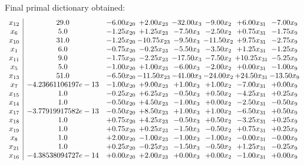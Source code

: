 \documentclass[8pt]{article}
\begin{document}
 Final primal dictionary obtained: 
\[\begin{array}{c| c c@{\hskip 2pt} c@{\hskip 2pt} c@{\hskip 2pt} c@{\hskip 2pt} c@{\hskip 2pt} c@{\hskip 2pt} }
 x_{12}   &  29.0 & -6.00 x_{20} & +  2.00 x_{23} & -32.00 x_{3} & -9.00 x_{2} & +  6.00 x_{31} & -7.00 x_{9}\\
 x_{6}   &  5.0 & -1.25 x_{20} & +  1.25 x_{23} & -7.50 x_{3} & -2.50 x_{2} & +  0.75 x_{31} & -1.75 x_{9}\\
 x_{10}   &  31.0 & -1.25 x_{20} & -10.75 x_{23} & -9.50 x_{3} & -11.50 x_{2} & +  9.75 x_{31} & -2.75 x_{9}\\
 x_{1}   &  6.0 & -0.75 x_{20} & -0.25 x_{23} & -5.50 x_{3} & -3.50 x_{2} & +  1.25 x_{31} & -1.25 x_{9}\\
 x_{11}   &  9.0 & -1.75 x_{20} & -2.25 x_{23} & -17.50 x_{3} & -7.50 x_{2} & + 10.25 x_{31} & -5.25 x_{9}\\
 x_{5}   &  5.0 & -1.00 x_{20} & +  1.00 x_{23} & -6.00 x_{3} & -2.00 x_{2} & +  0.00 x_{31} & -1.00 x_{9}\\
 x_{13}   &  51.0 & -6.50 x_{20} & -11.50 x_{23} & -41.00 x_{3} & -24.00 x_{2} & + 24.50 x_{31} & -13.50 x_{9}\\
 x_{7}   &  -4.23661106197e-13 & -1.00 x_{20} & +  9.00 x_{23} & +  1.00 x_{3} & +  1.00 x_{2} & -7.00 x_{31} & +  0.00 x_{9}\\
 x_{15}   &  1.0 & -0.25 x_{20} & +  6.25 x_{23} & -0.50 x_{3} & +  0.50 x_{2} & -4.25 x_{31} & +  0.25 x_{9}\\
 x_{14}   &  1.0 & -0.50 x_{20} & +  4.50 x_{23} & -1.00 x_{3} & +  0.00 x_{2} & -2.50 x_{31} & -0.50 x_{9}\\
 x_{17}   &  -3.77919917582e-13 & -0.50 x_{20} & +  8.50 x_{23} & +  1.00 x_{3} & +  1.00 x_{2} & -6.50 x_{31} & +  0.50 x_{9}\\
 x_{18}   &  1.0 & +  0.75 x_{20} & +  4.25 x_{23} & -0.50 x_{3} & +  0.50 x_{2} & -3.25 x_{31} & +  0.25 x_{9}\\
 x_{19}   &  1.0 & +  0.75 x_{20} & +  0.25 x_{23} & -1.50 x_{3} & -0.50 x_{2} & +  0.75 x_{31} & +  0.25 x_{9}\\
 x_{8}   &  1.0 & +  2.00 x_{20} & -1.00 x_{23} & -1.00 x_{3} & -1.00 x_{2} & -0.00 x_{31} & -0.00 x_{9}\\
 x_{21}   &  1.0 & +  0.25 x_{20} & -0.25 x_{23} & -1.50 x_{3} & -0.50 x_{2} & +  1.25 x_{31} & -0.25 x_{9}\\
 x_{16}   &  -4.38538094727e-14 & +  0.00 x_{20} & +  2.00 x_{23} & +  0.00 x_{3} & +  0.00 x_{2} & -1.00 x_{31} & +  0.00 x_{9}\\

\end{array}\]
\end{document}

